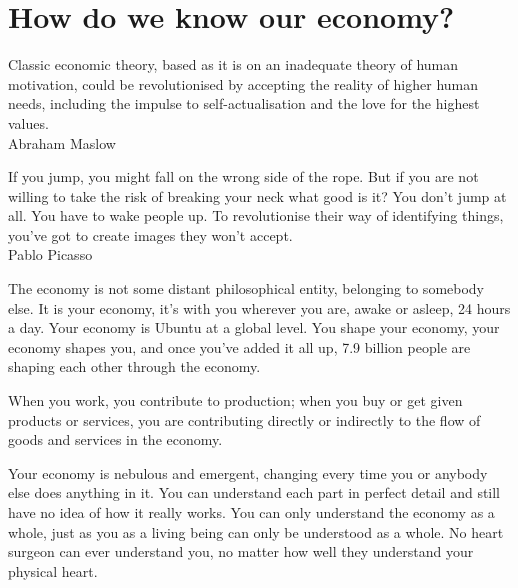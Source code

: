 ﻿%
\chapter{How do we know our economy?}
\label{chapter:know-our-economy}


\begin{chapterquotation}
Classic economic theory, based as it is on an inadequate theory of human motivation, could be revolutionised by accepting the reality of higher human needs, including the impulse to self-actualisation and the love for the highest values.\\
\raggedleft\textemdash Abraham Maslow


\centering
If you jump, you might fall on the wrong side of the rope. But if you are not willing to take the risk of breaking your neck what good is it? You don't jump at all. You have to wake people up. To revolutionise their way of identifying things, you've got to create images they won't accept.\\
\raggedleft\textemdash Pablo Picasso\cite{gardner-creating-minds}
\end{chapterquotation}


The economy is not some distant philosophical entity, belonging to somebody else. It is your economy, it's with you wherever you are, awake or asleep, 24 hours a day. Your economy is Ubuntu at a global level. You shape your economy, your economy shapes you, and once you've added it all up, 7.9 billion people are shaping each other through the economy.


When you work, you contribute to production; when you buy or get given products or services, you are contributing directly or indirectly to the flow of goods and services in the economy. 


Your economy is nebulous and emergent, changing every time you or anybody else does anything in it. You can understand each part in perfect detail and still have no idea of how it really works. You can only understand the economy as a whole, just as you as a living being can only be understood as a whole. No heart surgeon can ever understand you, no matter how well they understand your physical heart. 


